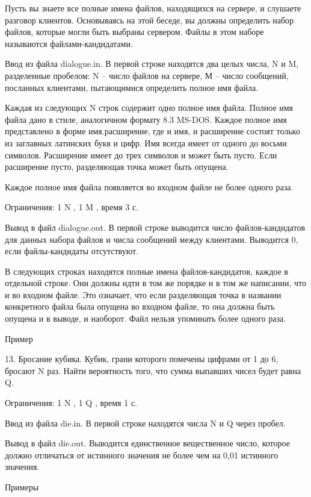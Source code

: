 \documentclass[]{article}
\begin{document}
Пусть вы знаете все полные имена файлов, находящихся на сервере, и слушаете разговор клиентов. Основываясь на этой беседе, вы должны определить набор файлов, которые могли быть выбраны сервером. Файлы в этом наборе называются файлами-кандидатами.

Ввод из файла dialogue.in. В первой строке находятся два целых числа, N и M, разделенные пробелом: N – число файлов на сервере, М – число сообщений, посланных клиентами, пытающимися определить полное имя файла.

Каждая из следующих N строк содержит одно полное имя файла. Полное имя файла дано в стиле, аналогичном формату 8.3 MS-DOS. Каждое полное имя представлено в форме имя.расширение, где и имя, и расширение состоят только из заглавных латинских букв и цифр. Имя всегда имеет от одного до восьми символов. Расширение имеет до трех символов и может быть пусто. Если расширение пусто, разделяющая точка может быть опущена.

Каждое полное имя файла появляется во входном файле не более одного раза.

Ограничения: 1 \leq N , 1 \leq M , время 3 с.

Вывод в файл dialogue.out. В первой строке выводится число файлов-кандидатов для данных набора файлов и числа сообщений между клиентами. Выводится 0, если файлы-кандидаты отсутствуют.

В следующих строках находятся полные имена файлов-кандидатов, каждое в отдельной строке. Они должны идти в том же порядке и в том же написании, что и во входном файле. Это означает, что если разделяющая точка в названии конкретного файла была опущена во входном файле, то она должна быть опущена и в выводе, и наоборот. Файл нельзя упоминать более одного раза.

Пример



	13. Бросание кубика. Кубик, грани которого помечены цифрами от 1 до 6, бросают N раз. Найти вероятность того, что сумма выпавших чисел будет равна Q.

Ограничения: 1 \leq N , 1 \leq Q , время 1 с.

Ввод из файла die.in. В первой строке находятся числа N и Q через пробел.

Вывод в файл die.out. Выводится единственное вещественное число, которое должно отличаться от истинного значения не более чем на 0,01 истинного значения.

Примеры
\end{document}
